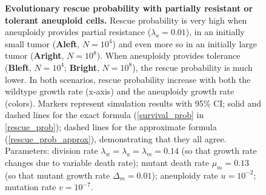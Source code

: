 \documentclass[12pt]{extarticle}
\begin{document}
\begin{figure}
\begin{subfigure}{0.5\textwidth}
\end{subfigure}
\caption{
\textbf{Evolutionary rescue probability with partially resistant or tolerant aneuploid cells.}
Rescue probability is very high when aneuploidy provides partial resistance ($\lambda_a=0.01$), in an initially small tumor (\textbf{Aleft}, $N=10^4$) and even more so in an initially large tumor (\textbf{Aright}, $N=10^8$). 
When aneuploidy provides tolerance (\textbf{Bleft}, $N=10^4$; \textbf{Bright}, $N=10^8$), the rescue probability is much lower. 
In both scenarios, rescue probability increase with both the wildtype growth rate (x-axis) and the aneuploidy growth rate (colors).
Markers represent simulation results with 95\% CI; solid and dashed lines for the exact formula (\cref{survival_prob} in \cref{rescue_prob}); dashed lines for the approximate formula (\cref{rescue_prob_approx}), demonstrating that they all agree.
Parameters: division rate $\lambda_w=\lambda_a=\lambda_m=0.14$ (so that growth rate changes due to variable death rate); mutant death rate $\mu_m=0.13$ (so that mutant growth rate $\Delta_m=0.01$); aneuploidy rate $u=10^{-2}$; mutation rate $v=10^{-7}$.
}
\label{rescue_prob_wt_growth}
\end{figure}
\end{document}
